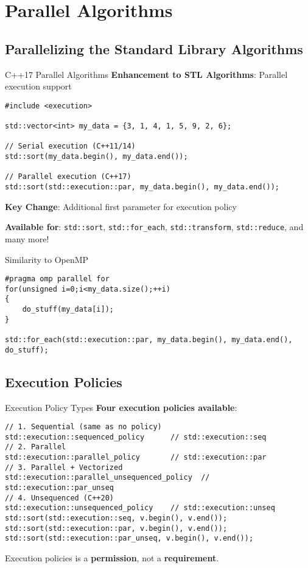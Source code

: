 \section{Parallel Algorithms}

\subsection{Parallelizing the Standard Library Algorithms}
\begin{frame}[fragile]{C++17 Parallel Algorithms}
	\textbf{Enhancement to STL Algorithms}: Parallel execution support

	\begin{verbatim}
#include <execution>

std::vector<int> my_data = {3, 1, 4, 1, 5, 9, 2, 6};

// Serial execution (C++11/14)
std::sort(my_data.begin(), my_data.end());

// Parallel execution (C++17)
std::sort(std::execution::par, my_data.begin(), my_data.end());
	\end{verbatim}

	\textbf{Key Change}: Additional first parameter for execution policy

	\vspace{0.5em}
	\textbf{Available for}: \texttt{std::sort}, \texttt{std::for\_each}, \texttt{std::transform}, \texttt{std::reduce}, and many more!
\end{frame}

\begin{frame}[fragile]{Similarity to OpenMP}
	\begin{verbatim}
#pragma omp parallel for
for(unsigned i=0;i<my_data.size();++i)
{
    do_stuff(my_data[i]);
}

std::for_each(std::execution::par, my_data.begin(), my_data.end(), do_stuff);
    \end{verbatim}
\end{frame}

\subsection{Execution Policies}
\begin{frame}[fragile]{Execution Policy Types}
	\textbf{Four execution policies available}:

	\begin{verbatim}
// 1. Sequential (same as no policy)
std::execution::sequenced_policy      // std::execution::seq
// 2. Parallel
std::execution::parallel_policy       // std::execution::par
// 3. Parallel + Vectorized
std::execution::parallel_unsequenced_policy  // std::execution::par_unseq
// 4. Unsequenced (C++20)
std::execution::unsequenced_policy    // std::execution::unseq
std::sort(std::execution::seq, v.begin(), v.end());
std::sort(std::execution::par, v.begin(), v.end());
std::sort(std::execution::par_unseq, v.begin(), v.end());
	\end{verbatim}

	Execution policies is a \textbf{permission}, not a \textbf{requirement}.
\end{frame}

